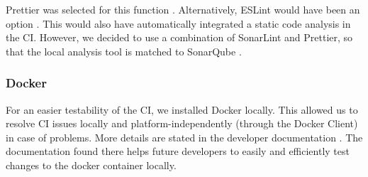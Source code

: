 Prettier was selected for this function \cite{dev}.
Alternatively, ESLint would have been an option \cite{eslint}.
This would also have automatically integrated a static code analysis in the CI.
However, we decided to use a combination of SonarLint and Prettier,
so that the local analysis tool is matched to SonarQube \cite{dev}.

\subsubsection{Docker}
For an easier testability of the CI, we installed Docker locally. 
This allowed us to resolve CI issues locally and platform-independently (through the Docker Client) in case of problems.
More details are stated in the developer documentation \cite{dev}.
The documentation found there helps future developers to easily and efficiently test changes to the docker container locally. \\
